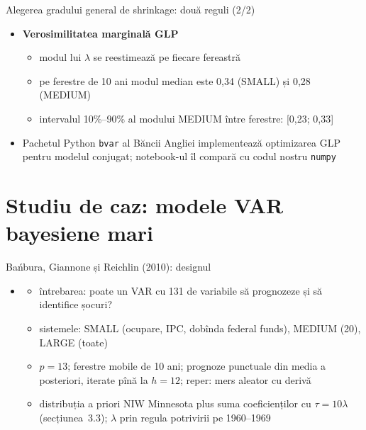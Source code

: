 \begin{frame}{Alegerea gradului general de shrinkage: două reguli (2/2)}
\itemsize{\small}
\begin{itemize}
    \item \textbf{Verosimilitatea marginală GLP} 
    \begin{itemize}
        \item modul lui $\lambda$ se reestimează pe fiecare fereastră
        \item pe ferestre de 10 ani modul median este 0{,}34 (SMALL) și 0{,}28 (MEDIUM)
        \item intervalul 10\%--90\% al modului MEDIUM între ferestre: [0{,}23; 0{,}33]
    \end{itemize}
    \item Pachetul Python \texttt{bvar} al Băncii Angliei implementează optimizarea GLP pentru modelul conjugat; notebook-ul îl compară cu codul nostru \texttt{numpy}
\end{itemize}
\end{frame}


\section{Studiu de caz: modele VAR bayesiene mari}

\begin{frame}{Bańbura, Giannone și Reichlin (2010): designul}
\itemsize{\small}
\begin{itemize}
    \item {}
    \begin{itemize}
        \item întrebarea: poate un VAR cu 131 de variabile să prognozeze și să identifice șocuri?
        \item sistemele: SMALL (ocupare, IPC, dobînda federal funds), MEDIUM (20), LARGE (toate)
        \item $p = 13$; ferestre mobile de 10 ani; prognoze punctuale din media a posteriori, iterate pînă la $h = 12$; reper: mers aleator cu derivă
        \item distribuția a priori NIW Minnesota plus suma coeficienților cu $\tau = 10\lambda$ (secțiunea~3.3); $\lambda$ prin regula potrivirii pe 1960--1969
    \end{itemize}
\end{itemize}
\end{frame}

